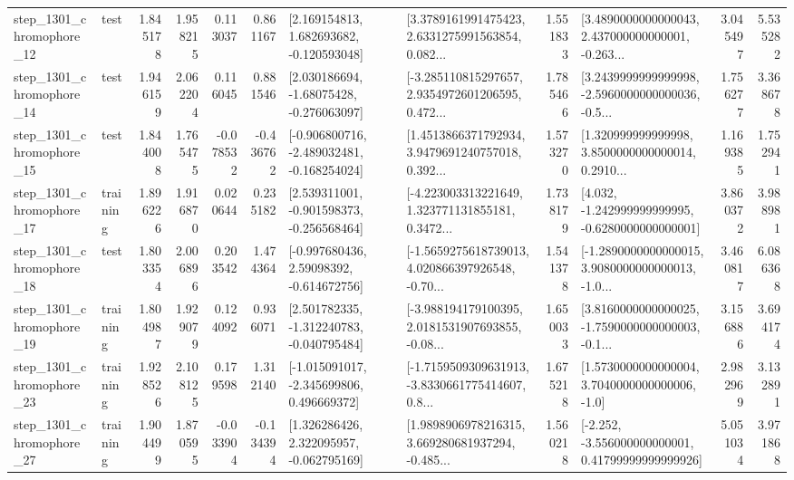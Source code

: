 \begin{tabular}{llrrrrllrlrr}
 step\_1301\_chromophore\_12 &      test &      1.845178 &    1.958215 &      0.113037 &  0.861167 &    [2.169154813, 1.682693682, -0.120593048] &  [3.3789161991475423, 2.6331275991563854, 0.082... &       1.551833 &  [3.4890000000000043, 2.437000000000001, -0.263... &            3.045497 &          5.535282 \\
 step\_1301\_chromophore\_14 &      test &      1.946159 &    2.062204 &      0.116045 &  0.881546 &    [2.030186694, -1.68075428, -0.276063097] &  [-3.285110815297657, 2.9354972601206595, 0.472... &       1.785466 &  [3.2439999999999998, -2.5960000000000036, -0.5... &            1.756277 &          3.368678 \\
 step\_1301\_chromophore\_15 &      test &      1.844008 &    1.765475 &     -0.078532 & -0.436762 &  [-0.906800716, -2.489032481, -0.168254024] &  [1.4513866371792934, 3.9479691240757018, 0.392... &       1.573270 &  [1.320999999999998, 3.8500000000000014, 0.2910... &            1.169385 &          1.752941 \\
 step\_1301\_chromophore\_17 &  training &      1.896226 &    1.916870 &      0.020644 &  0.235182 &   [2.539311001, -0.901598373, -0.256568464] &  [-4.223003313221649, 1.323771131855181, 0.3472... &       1.738179 &   [4.032, -1.242999999999995, -0.6280000000000001] &            3.860372 &          3.988981 \\
 step\_1301\_chromophore\_18 &      test &      1.803354 &    2.006896 &      0.203542 &  1.474364 &    [-0.997680436, 2.59098392, -0.614672756] &  [-1.5659275618739013, 4.020866397926548, -0.70... &       1.541378 &  [-1.2890000000000015, 3.9080000000000013, -1.0... &            3.460817 &          6.086368 \\
 step\_1301\_chromophore\_19 &  training &      1.804987 &    1.929079 &      0.124092 &  0.936071 &   [2.501782335, -1.312240783, -0.040795484] &  [-3.988194179100395, 2.0181531907693855, -0.08... &       1.650033 &  [3.8160000000000025, -1.7590000000000003, -0.1... &            3.156886 &          3.694174 \\
 step\_1301\_chromophore\_23 &  training &      1.928526 &    2.108125 &      0.179598 &  1.312140 &   [-1.015091017, -2.345699806, 0.496669372] &  [-1.7159509309631913, -3.8330661775414607, 0.8... &       1.675218 &     [1.5730000000000004, 3.7040000000000006, -1.0] &            2.982969 &          3.132891 \\
 step\_1301\_chromophore\_27 &  training &      1.904499 &    1.870595 &     -0.033904 & -0.134394 &    [1.326286426, 2.322095957, -0.062795169] &  [1.9898906978216315, 3.669280681937294, -0.485... &       1.560218 &  [-2.252, -3.556000000000001, 0.41799999999999926] &            5.051034 &          3.971868 \\

\end{tabular}
